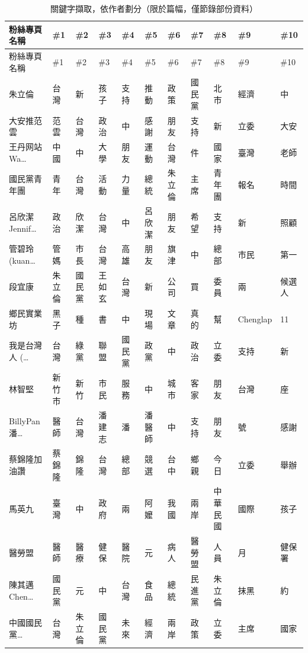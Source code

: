 \documentclass[a4paper, 10pt, conference]{ieeeconf}       %
\begin{document}
\begin{CJK}{UTF8}{bsmi}
\begin{longtable}[c]{@{}L{2.45cm}L{1.1cm}L{1.1cm}L{1.1cm}L{1.1cm}L{1.1cm}L{1.1cm}L{1.1cm}L{1.41cm}L{1.1cm}L{1.1cm}@{}}
\caption{關鍵字擷取，依作者劃分{\small （限於篇幅，僅節錄部份資料）}}
\label{t2}\\
\toprule
粉絲專頁名稱 & \#1 & \#2 & \#3 & \#4 & \#5 & \#6 & \#7 & \#8 & \#9 & \#10 \\* \midrule
\endfirsthead
\toprule
粉絲專頁名稱 & \#1 & \#2 & \#3 & \#4 & \#5 & \#6 & \#7 & \#8 & \#9 & \#10 \\* \midrule
\endhead
%
\bottomrule
\endfoot
%
\endlastfoot
%
朱立倫 & 台灣 & 新 & 孩子 & 支持 & 推動 & 政策 & 國民黨 & 北市 & 經濟 & 中 \\
大安推范雲 & 范雲 & 台灣 & 政治 & 中 & 感謝 & 朋友 & 支持 & 新 & 立委 & 大安 \\
王丹网站 Wa\dots & 中國 & 中 & 大學 & 朋友 & 運動 & 台灣 & 件 & 國家 & 臺灣 & 老師 \\
國民黨青年團 & 青年 & 台灣 & 活動 & 力量 & 總統 & 朱立倫 & 主席 & 青年團 & 報名 & 時間 \\
呂欣潔 Jennif\dots & 政治 & 欣潔 & 台灣 & 中 & 呂欣潔 & 朋友 & 希望 & 支持 & 新 & 照顧 \\
管碧玲 (kuan\dots & 管媽 & 市長 & 台灣 & 高雄 & 朋友 & 旗津 & 中 & 總部 & 市民 & 第一 \\
段宜康 & 朱立倫 & 國民黨 & 王如玄 & 台灣 & 新 & 公司 & 買 & 委員 & 兩 & 候選人 \\
鄉民實業坊 & 黑子 & 種 & 書 & 中 & 現場 & 文章 & 真的 & 幫 & Chenglap & 11 \\
我是台灣人 (\dots & 台灣 & 綠黨 & 聯盟 & 國民黨 & 政黨 & 中 & 政治 & 立委 & 支持 & 新 \\
林智堅 & 新竹市 & 新竹 & 市民 & 服務 & 中 & 城市 & 客家 & 朋友 & 台灣 & 座 \\
BillyPan 潘\dots & 醫師 & 台灣 & 潘建志 & 潘 & 潘醫師 & 中 & 支持 & 朋友 & 號 & 感謝 \\
蔡錦隆加油讚 & 蔡錦隆 & 錦隆 & 台灣 & 總部 & 競選 & 台中 & 鄉親 & 今日 & 立委 & 舉辦 \\
馬英九 & 臺灣 & 中 & 政府 & 兩 & 阿嬤 & 我國 & 兩岸 & 中華民國 & 國際 & 孩子 \\
醫勞盟 & 醫師 & 醫療 & 健保 & 醫院 & 元 & 病人 & 醫勞盟 & 人員 & 月 & 健保署 \\
陳其邁 Chen\dots & 國民黨 & 元 & 中 & 台灣 & 食品 & 總統 & 民進黨 & 朱立倫 & 抹黑 & 約 \\
中國國民黨\dots & 台灣 & 朱立倫 & 國民黨 & 未來 & 經濟 & 兩岸 & 政策 & 立委 & 主席 & 國家 \\

\end{longtable}
\end{CJK}
\end{document}
